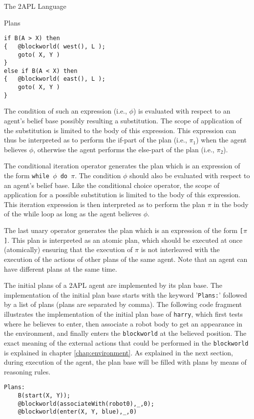 \begin{chapter}{The 2APL Language}
\begin{section}{Plans}
\begin{verbatim}
if B(A > X) then
{   @blockworld( west(), L );
    goto( X, Y )
}
else if B(A < X) then
{   @blockworld( east(), L );
    goto( X, Y )
}
\end{verbatim}

The condition of such an expression (i.e., $\phi$) is evaluated with
respect to an agent's belief base possibly resulting a substitution.
The scope of application of the substitution is limited to the body
of this  expression. This expression can thus be
interpreted as to perform the if-part of the plan (i.e., $\pi_1$)
when the agent believes $\phi$, otherwise the agent performs the
else-part of the plan (i.e., $\pi_2$).

The conditional iteration operator generates the plan
 which is an expression of the form {\tt while $\phi$
do $\pi$}. The condition $\phi$ should also be evaluated with
respect to an agent's belief base. Like the conditional choice
operator, the scope of application for a possible substitution is
limited to the body of this  expression. This
iteration expression is then interpreted as to perform the plan
$\pi$ in the body of the while loop as long as the agent believes
$\phi$.

The last unary operator generates the plan
 which is an expression of the form {\tt [$\pi$]}.
This plan is interpreted as an atomic plan, which should be executed
at once (atomically) ensuring that the execution of $\pi$ is not
interleaved with the execution of the actions of other plans of the
same agent. Note that an agent can have different plans at the same
time.

The initial plans of a 2APL agent are implemented by its plan base.
The implementation of the initial plan base starts with the keyword
'{\tt Plans:}' followed by a list of plans (plans are separated by
comma). The following code fragment illustrates the implementation
of the initial plan base of {\tt harry}, which first tests where he
believes to enter, then associate a robot body to get an appearance
in the environment, and finally enters the {\tt blockworld} at the
believed position. The exact meaning of the external actions that
could be performed in the {\tt blockworld} is explained in chapter
\ref{chap:environment}. As explained in the next section, during
execution of the agent, the plan base will be filled with plans by
means of reasoning rules.

\begin{verbatim}
Plans:
    B(start(X, Y));
    @blockworld(associateWith(robot0),_,0);
    @blockworld(enter(X, Y, blue),_,0)
\end{verbatim}


\end{section}
\end{chapter}
